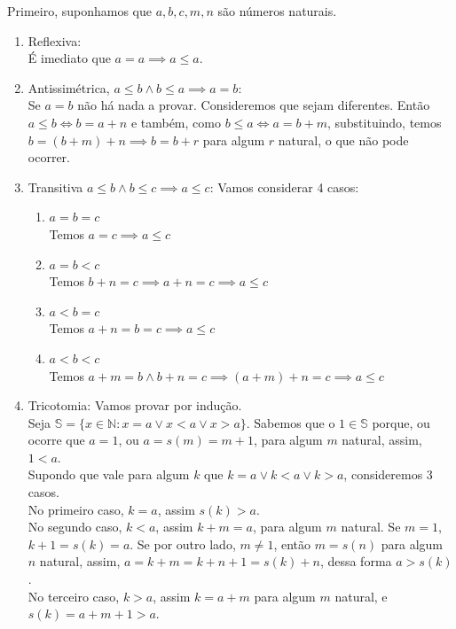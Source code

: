 \documentclass[../main.tex]{subfiles}
\begin{document}
\begin{dem}
    Primeiro, suponhamos que $a,b,c,m,n$ são números naturais.
    \begin{enumerate}[label=(\roman*)]
        \item Reflexiva: \\
            É imediato que $a = a \implies a \leq a$.
        \item Antissimétrica, $a \leq b \land b \leq a \implies a=b$: \\
            Se $a=b$ não há nada a provar. Consideremos que sejam diferentes.
            Então $a \leq b \iff b = a + n$ e também, como $b \leq a \iff a = b + m$, substituindo, temos $b = (b+m) + n \implies b = b+r$ para algum $r$ natural, o que não pode ocorrer. %
        \item Transitiva $a \leq b \land b \leq c \implies a \leq c$: 
            Vamos considerar 4 casos:
            \begin{enumerate}[label=(\arabic*)]
                \item $a = b = c$ \\
                    Temos $a = c \implies a \leq c$\\
                \item $a = b < c$ \\
                    Temos $ b + n = c \implies a + n = c\implies a \leq c$\\
                \item $a < b = c$ \\
                    Temos $a + n = b = c \implies a \leq c$\\
                \item $a < b < c$ \\
                    Temos $a + m = b \land b + n = c \implies ( a + m ) + n = c \implies a \leq c$
            \end{enumerate}
        \item Tricotomia:
        Vamos provar por indução. \\
        Seja $\mathbb{S} = \{ x \in \mathbb{N} : x = a \lor x < a \lor x > a \}$. Sabemos que o $1 \in \mathbb{S}$ porque, ou ocorre que $a = 1$, ou $a = s(m) = m + 1$, para algum $m$ natural, assim, $1 < a$. \\
        Supondo que vale para algum $k$ que $k = a \lor k < a \lor k > a$, consideremos 3 casos.  \\
        
        No primeiro caso, $k = a$, assim $s(k) > a$. \\
        No segundo caso, $k < a$, assim $k + m = a$, para algum $m$ natural. Se $m = 1$, $k+1 = s(k) = a$. Se por outro lado, $m \neq 1$, então $m = s(n)$ para algum $n$ natural, assim, $a = k + m = k + n + 1 = s(k) + n$, dessa forma $a > s(k)$. \\
        No terceiro caso, $k > a$, assim $k = a + m$ para algum $m$ natural, e $s(k) = a + m + 1 > a$.


\end{enumerate}
\end{dem}
\end{document}
